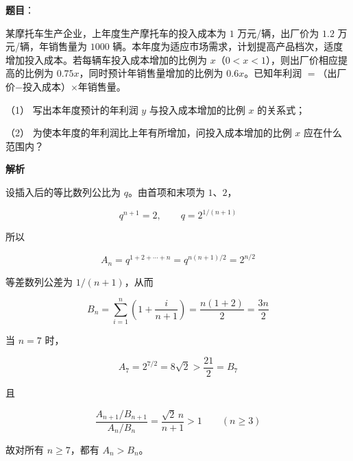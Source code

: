 \begin{answer}

\textbf{题目}：

某摩托车生产企业，上年度生产摩托车的投入成本为 $1$ 万元/辆，出厂价为 $1.2$ 万元/辆，年销售量为 $1000$ 辆。本年度为适应市场需求，计划提高产品档次，适度增加投入成本。若每辆车投入成本增加的比例为 $x$（$0<x<1$），则出厂价相应提高的比例为 $0.75x$，同时预计年销售量增加的比例为 $0.6x$。已知年利润 $=$（出厂价$-$投入成本）$\times$年销售量。

（1） 写出本年度预计的年利润 $y$ 与投入成本增加的比例 $x$ 的关系式；

（2） 为使本年度的年利润比上年有所增加，问投入成本增加的比例 $x$ 应在什么范围内？

\textbf{解析}


设插入后的等比数列公比为 $q$。由首项和末项为 $1\text{、}2$，

\nopagebreak[4]
\[
q^{n+1}=2,\qquad q=2^{1/(n+1)}
\]

所以

\nopagebreak[4]
\[
A_n=q^{1+2+\cdots+n}
=q^{n(n+1)/2}
=2^{n/2}
\]

等差数列公差为 $1/(n+1)$，从而

\nopagebreak[4]
\[
B_n=\sum_{i=1}^n\left(1+\frac{i}{n+1}\right)
=\frac{n(1+2)}2
=\frac{3n}{2}
\]


当 $n=7$ 时，

\nopagebreak[4]
\[
A_7=2^{7/2}=8\sqrt2>\frac{21}{2}=B_7
\]

且

\nopagebreak[4]
\[
\frac{A_{n+1}/B_{n+1}}{A_n/B_n}
=\frac{\sqrt2\,n}{n+1}>1\qquad(n\ge3)
\]

故对所有 $n\ge7$，都有 $A_n>B_n$。



\end{answer}
